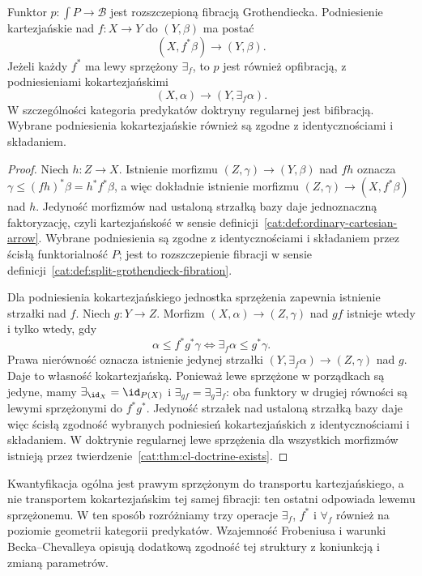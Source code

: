 \begin{twierdzenie}\label{cat:thm:cl-predicate-bifibration}
Funktor $p:\int P\to\mathcal B$ jest rozszczepioną fibracją Grothendiecka. Podniesienie kartezjańskie nad $f:X\to Y$ do $(Y,\beta)$ ma postać
\[
 (X,f^*\beta)\longrightarrow(Y,\beta).
\]
Jeżeli każdy $f^*$ ma lewy sprzężony $\exists_f$, to $p$ jest również opfibracją, z podniesieniami kokartezjańskimi
\[
 (X,\alpha)\longrightarrow(Y,\exists_f\alpha).
\]
W szczególności kategoria predykatów doktryny regularnej jest bifibracją. Wybrane podniesienia kokartezjańskie również są zgodne z identycznościami i składaniem.
\end{twierdzenie}
\begin{proof}
Niech $h:Z\to X$. Istnienie morfizmu $(Z,\gamma)\to(Y,\beta)$ nad $fh$ oznacza $\gamma\leq(fh)^*\beta=h^*f^*\beta$, a więc dokładnie istnienie morfizmu $(Z,\gamma)\to(X,f^*\beta)$ nad $h$. Jedyność morfizmów nad ustaloną strzałką bazy daje jednoznaczną faktoryzację, czyli kartezjańskość w sensie definicji~\ref{cat:def:ordinary-cartesian-arrow}. Wybrane podniesienia są zgodne z identycznościami i składaniem przez ścisłą funktorialność $P$; jest to rozszczepienie fibracji w sensie definicji~\ref{cat:def:split-grothendieck-fibration}.

Dla podniesienia kokartezjańskiego jednostka sprzężenia zapewnia istnienie strzałki nad $f$. Niech $g:Y\to Z$. Morfizm $(X,\alpha)\to(Z,\gamma)$ nad $gf$ istnieje wtedy i tylko wtedy, gdy
\[
 \alpha\leq f^*g^*\gamma\iff\exists_f\alpha\leq g^*\gamma.
\]
Prawa nierówność oznacza istnienie jedynej strzałki $(Y,\exists_f\alpha)\to(Z,\gamma)$ nad $g$. Daje to własność kokartezjańską. Ponieważ lewe sprzężone w porządkach są jedyne, mamy $\exists_{\id_X}=\id_{P(X)}$ i $\exists_{gf}=\exists_g\exists_f$: oba funktory w drugiej równości są lewymi sprzężonymi do $f^*g^*$. Jedyność strzałek nad ustaloną strzałką bazy daje więc ścisłą zgodność wybranych podniesień kokartezjańskich z identycznościami i składaniem. W doktrynie regularnej lewe sprzężenia dla wszystkich morfizmów istnieją przez twierdzenie~\ref{cat:thm:cl-doctrine-exists}.
\end{proof}

Kwantyfikacja ogólna jest prawym sprzężonym do transportu kartezjańskiego, a nie transportem kokartezjańskim tej samej fibracji: ten ostatni odpowiada lewemu sprzężonemu. W ten sposób rozróżniamy trzy operacje $\exists_f$, $f^*$ i $\forall_f$ również na poziomie geometrii kategorii predykatów. Wzajemność Frobeniusa i warunki Becka--Chevalleya opisują dodatkową zgodność tej struktury z koniunkcją i zmianą parametrów.

